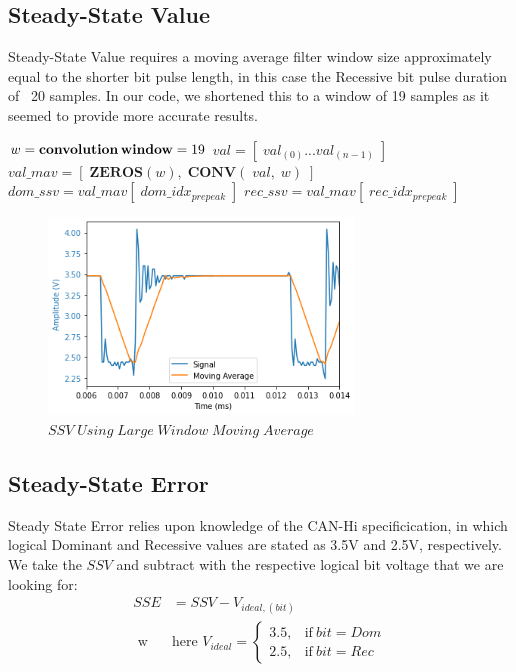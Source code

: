 \documentclass[conference]{IEEEtran}
\begin{document}
\subsection{Steady-State Value} \label{sec:SSV}
Steady-State Value requires a moving average filter window size approximately equal to the shorter bit pulse length, in this case the Recessive bit pulse duration of ~20 samples. In our code, we shortened this to a window of 19 samples as it seemed to provide more accurate results.
\medbreak
\begin{algorithmic}
\STATE $w = \textbf{convolution\,window} = 19$
\STATE $val = [\;val_{(0)} ... val_{(n-1)}\;] $
\STATE $val\_mav = [\;\textbf{ZEROS}(w),\;\textbf{CONV}(\;val,\;w)\;] $
\STATE $dom\_ssv = val\_mav[\;dom\_idx_{prepeak}\;]$
\STATE $rec\_ssv = val\_mav[\;rec\_idx_{prepeak}\;]$
\end{algorithmic}
\medbreak

\begin{figure}[htb]
\centering
\includegraphics[width=3.2in]{figures/52_ssv.png}
\caption{$SSV\;Using\;Large\;Window\;Moving\;Average$}
\label{fig:SSV}
\end{figure}

\subsection{Steady-State Error} \label{sec:SSE}
Steady State Error relies upon knowledge of the CAN-Hi specificication, in which logical Dominant and Recessive values are stated as 3.5V and 2.5V, respectively. We take the $SSV$ and subtract with the respective logical bit voltage that we are looking for:
\begin{align*}
SSE &= SSV - V_{ideal,(bit)} \\ \text{ w} & \text{here } V_{ideal} =
    \begin{cases}
      3.5, & \text{if}\ bit=Dom \\
      2.5, & \text{if}\ bit=Rec 
    \end{cases}
\end{align*}
\end{document}
